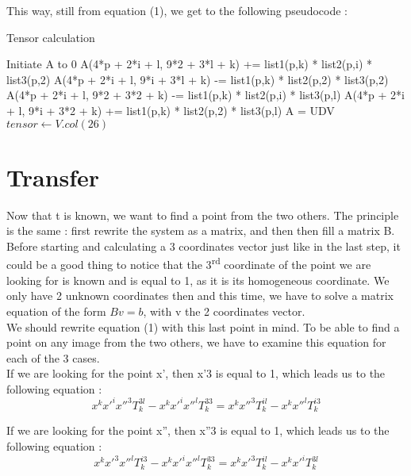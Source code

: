 \documentclass[a4paper,10pt]{report}
\begin{document}
This way, still from equation (1), we get to the following pseudocode :
\begin{algorithm}
\caption{Tensor calculation}
\begin{algorithmic}
\STATE Initiate A to 0
\STATE A(4*p + 2*i + l, 9*2 + 3*l + k) += list1(p,k) * list2(p,i) * list3(p,2)
\STATE A(4*p + 2*i + l, 9*i + 3*l + k) -= list1(p,k) * list2(p,2) * list3(p,2)
\STATE A(4*p + 2*i + l, 9*2 + 3*2 + k) -= list1(p,k) * list2(p,i) * list3(p,l)
\STATE A(4*p + 2*i + l, 9*i + 3*2 + k) += list1(p,k) * list2(p,2) * list3(p,l)
\ENDFOR
\ENDFOR
\ENDFOR
\ENDFOR
\STATE A = UDV 
\STATE $tensor \leftarrow V.col(26)$
\end{algorithmic}
\end{algorithm}

\section{Transfer}


Now that t is known, we want to find a point from the two others. The principle is the same : first rewrite the system as a matrix, and then
then fill a matrix B.
\\

Before starting and calculating a 3 coordinates vector just like in the last step, it could be a good thing to notice that the 3\textsuperscript{rd} 
coordinate of the point we are looking for is known and is equal to 1, as it is its homogeneous coordinate. We only have 2 unknown coordinates then 
and this time, we have to solve a matrix equation of the form \begin{math}Bv = b\end{math},  with v the 2 coordinates vector.
\\

We should rewrite equation (1) with this last point in mind. To be able to find a point on any image from the two others, we have to 
examine this equation for each of the 3 cases.
\\

If we are looking for the point x’, then x’3 is equal to 1, which leads us to the following equation :
\[x^{k}x'^{i}x''^{3}T^{3l}_{k} - x^{k}x'^{i}x''^{l}T^{33}_{k} = x^{k}x''^{3}T^{il}_{k} - x^{k}x''^{l}T^{i3}_{k}\]

If we are looking for the point x”, then x”3 is equal to 1, which leads us to the following equation :
\[x^{k}x'^{3}x''^{l}T^{i3}_{k} - x^{k}x'^{i}x''^{l}T^{33}_{k} = x^{k}x'^{3}T^{il}_{k} - x^{k}x'^{i}T^{3l}_{k}\]
\end{document}
